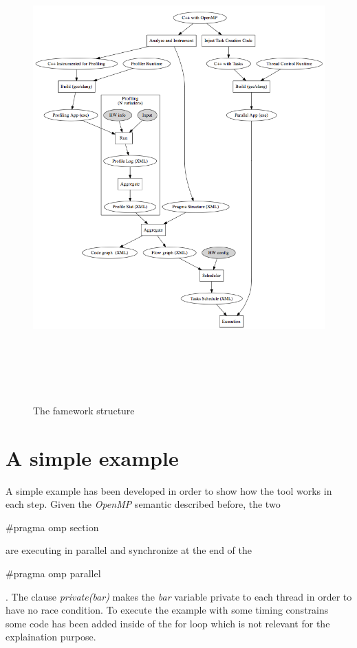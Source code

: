 \documentclass[a4paper,11pt,oneside]{book}
\begin{document}
\begin{figure}[H]
\centering
\includegraphics[width = 160mm, height = 180mm]{framework.png}
\caption{The famework structure}
\label{framework}
\end{figure}


\section{A simple example}
\label{example}
A simple example has been developed in order to show how the tool works in each step. Given the \emph{OpenMP} semantic described before, the two \begin{bf}$\#$pragma omp section\end{bf} are executing in parallel and synchronize at the end of the \begin{bf}$\#$pragma omp parallel\end{bf}. The clause \emph{private(bar)} makes the \emph{bar} variable private to each thread in order to have no race condition. To execute the example with some timing constrains some code has been added inside of the for loop which is not relevant for the explaination purpose.
\end{document}
